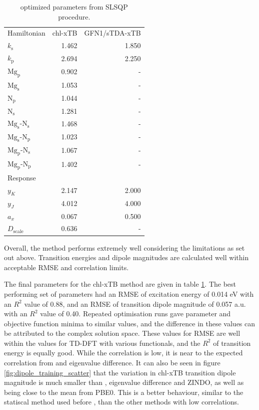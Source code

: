 \begin{table}
    \centering
    \begin{tabular}{|| l r | r ||}
    \hline
    Hamiltonian & chl-xTB & GFN1/sTDA-xTB \\
    $k_\text{s}$ & 1.462 & 1.850 \\
    $k_\text{p}$ & 2.694 & 2.250 \\

    $\text{Mg}_\text{p}$ & 0.902 & - \\
    $\text{Mg}_\text{s}$ & 1.053 & - \\
    $\text{N}_\text{p}$ & 1.044 & - \\
    $\text{N}_\text{s}$ & 1.281 & - \\

    $\text{Mg}_\text{s}$-$\text{N}_\text{s}$ & 1.468 & - \\
    $\text{Mg}_\text{s}$-$\text{N}_\text{p}$ & 1.023 & - \\
    $\text{Mg}_\text{p}$-$\text{N}_\text{s}$ & 1.067 & - \\
    $\text{Mg}_\text{p}$-$\text{N}_\text{p}$ & 1.402 & - \\

    \hline\hline
    Response & & \\
    $y_K$ & 2.147 & 2.000 \\
    $y_J$ & 4.012 & 4.000 \\
    $a_x$ & 0.067 & 0.500 \\
    $D_{\text{scale}}$ & 0.636 & - \\
    \hline
    \end{tabular}
    \caption{optimized parameters from SLSQP procedure.}
    \label{table:chl_params}
\end{table}

Overall, the method performs extremely well considering the limitations as set out
above. Transition energies and dipole magnitudes are calculated well within acceptable
RMSE and correlation limits.

The final parameters for the chl-xTB method are given in table \ref{table:chl_params}.
The best performing set of parameters had an RMSE of excitation energy of 0.014 eV 
with an $R^2$ value of 0.88, and an RMSE of transition dipole magnitude of 0.057 a.u. 
with an $R^2$ value of 0.40. Repeated optimisation runs gave parameter and objective
function minima to similar values, and the difference in these values can be attributed
to the complex solution space. These values for RMSE are well within the values
for TD-DFT with various functionals, and the $R^2$ of transition energy is equally
good. While the correlation is low, it is near to the expected correlation from
\dscf and eigenvalue difference. It can also be seen in figure \ref{fig:dipole_training_scatter}
that the variation in chl-xTB transition dipole magnitude is much smaller than \dscf,
eigenvalue difference and ZINDO, as well as being close to the mean from PBE0. This
is a better behaviour, similar to the statiscal method used before \cite{Stross2016},
than the other methods with low correlations.

